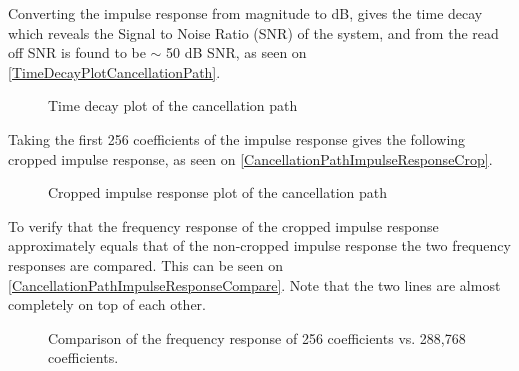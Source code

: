 Converting the impulse response from magnitude to dB, gives the time decay which reveals the Signal to Noise Ratio (SNR) of the system, and from the read off SNR is found to be $\sim$ 50 dB SNR, as seen on \autoref{TimeDecayPlotCancellationPath}.



\begin{figure}[H]
	\centering
	
	\caption{Time decay plot of the cancellation path}
	\label{TimeDecayPlotCancellationPath}
\end{figure}


Taking the first 256 coefficients of the impulse response gives the following cropped impulse response, as seen on \autoref{CancellationPathImpulseResponseCrop}.

\begin{figure}[H]
	\centering
	
	\caption{Cropped impulse response plot of the cancellation path}
	\label{CancellationPathImpulseResponseCrop}
\end{figure}

To verify that the frequency response of the cropped impulse response approximately equals that of the non-cropped impulse response the two frequency responses are compared. This can be seen on \autoref{CancellationPathImpulseResponseCompare}. Note that the two lines are almost completely on top of each other.

\begin{figure}[H]
	\centering
	
	\caption{Comparison of the frequency response of 256 coefficients vs. 288,768 coefficients.}
	\label{CancellationPathImpulseResponseCompare}
\end{figure}

